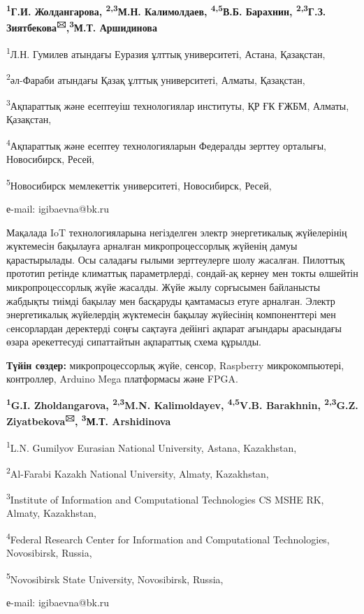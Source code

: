 \begin{center}
{\bfseries \textsuperscript{1}Г.И. Жолдангарова, \textsuperscript{2,3}М.Н.
Калимолдаев, \textsuperscript{4,5}В.Б. Барахнин,
\textsuperscript{2,3}Г.З. Зиятбекова\textsuperscript{🖂},\textsuperscript{3}М.Т. Аршидинова}

\textsuperscript{1}Л.Н. Гумилев атындағы Еуразия ұлттық университеті,
Астана, Қазақстан,

\textsuperscript{2}әл-Фараби атындағы Қазақ ұлттық университеті, Алматы,
Қазақстан,

\textsuperscript{3}Ақпараттық және есептеуіш технологиялар институты, ҚР
ҒК ҒЖБМ, Алматы, Қазақстан,

\textsuperscript{4}Ақпараттық және есептеу технологияларын Федералды
зерттеу орталығы, Новосибирск, Ресей,

\textsuperscript{5}Новосибирск мемлекеттік университеті, Новосибирск,
Ресей,

е-mail: igibaevna@bk.ru
\end{center}

Мақалада IoT технологияларына негізделген электр энергетикалық
жүйелерінің жүктемесін бақылауға арналған микропроцессорлық жүйенің
дамуы қарастырылады. Осы саладағы ғылыми зерттеулерге шолу жасалған.
Пилоттық прототип ретінде климаттық параметрлерді, сондай-ақ кернеу мен
токты өлшейтін микропроцессорлық жүйе жасалды. Жүйе жылу сорғысымен
байланысты жабдықты тиімді бақылау мен басқаруды қамтамасыз етуге
арналған. Электр энергетикалық жүйелердің жүктемесін бақылау жүйесінің
компоненттері мен cенсорлардан деректерді соңғы сақтауға дейінгі ақпарат
ағындары арасындағы өзара әрекеттесуді сипаттайтын ақпараттық схема
құрылды.

{\bfseries Түйін сөздер:} микропроцессорлық жүйе, сенсор, Raspberry
микрокомпьютері, контроллер, Arduino Mega платформасы және FPGA.



\begin{center}
{\bfseries \textsuperscript{1}G.I. Zholdangarova, \textsuperscript{2,3}M.N.
Kalimoldayev, \textsuperscript{4,5}V.B. Barakhnin,
\textsuperscript{2,3}G.Z. Ziyatbekova\textsuperscript{🖂}, \textsuperscript{3}М.Т. Arshidinova}

\textsuperscript{1}L.N. Gumilyov Eurasian National University, Astana,
Kazakhstan,

\textsuperscript{2}Al-Farabi Kazakh National University, Almaty,
Kazakhstan,

\textsuperscript{3}Institute of Information and Computational
Technologies CS MSHE RK, Almaty, Kazakhstan,

\textsuperscript{4}Federal Research Center for Information and
Computational Technologies, Novosibirsk, Russia,

\textsuperscript{5}Novosibirsk State University, Novosibirsk, Russia,

е-mail: igibaevna@bk.ru
\end{center}

